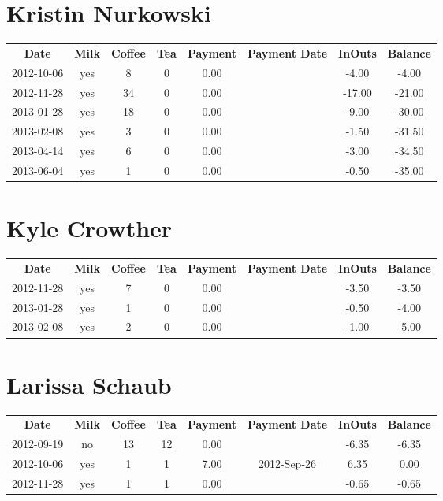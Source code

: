 \section{Kristin Nurkowski}

\begin{center}
\begin{tabular}{cccccccc}
\textbf{Date} & \textbf{Milk} & \textbf{Coffee} & \textbf{Tea} & \textbf{Payment} & \textbf{Payment Date} & \textbf{InOuts} & \textbf{Balance} \\
2012-10-06 & yes &  8 & 0 & 0.00 &  &  -4.00 &  -4.00\\ 
2012-11-28 & yes & 34 & 0 & 0.00 &  & -17.00 & -21.00\\ 
2013-01-28 & yes & 18 & 0 & 0.00 &  &  -9.00 & -30.00\\ 
2013-02-08 & yes &  3 & 0 & 0.00 &  &  -1.50 & -31.50\\ 
2013-04-14 & yes &  6 & 0 & 0.00 &  &  -3.00 & -34.50\\ 
2013-06-04 & yes &  1 & 0 & 0.00 &  &  -0.50 & -35.00
\end{tabular}
\end{center}

\section{Kyle Crowther}

\begin{center}
\begin{tabular}{cccccccc}
\textbf{Date} & \textbf{Milk} & \textbf{Coffee} & \textbf{Tea} & \textbf{Payment} & \textbf{Payment Date} & \textbf{InOuts} & \textbf{Balance} \\
2012-11-28 & yes & 7 & 0 & 0.00 &  & -3.50 & -3.50\\ 
2013-01-28 & yes & 1 & 0 & 0.00 &  & -0.50 & -4.00\\ 
2013-02-08 & yes & 2 & 0 & 0.00 &  & -1.00 & -5.00
\end{tabular}
\end{center}

\section{Larissa Schaub}

\begin{center}
\begin{tabular}{cccccccc}
\textbf{Date} & \textbf{Milk} & \textbf{Coffee} & \textbf{Tea} & \textbf{Payment} & \textbf{Payment Date} & \textbf{InOuts} & \textbf{Balance} \\
2012-09-19 & no & 13 & 12 & 0.00 &  & -6.35 & -6.35\\ 
2012-10-06 & yes &  1 &  1 & 7.00 & 2012-Sep-26 &  6.35 &  0.00\\ 
2012-11-28 & yes &  1 &  1 & 0.00 &  & -0.65 & -0.65
\end{tabular}
\end{center}


